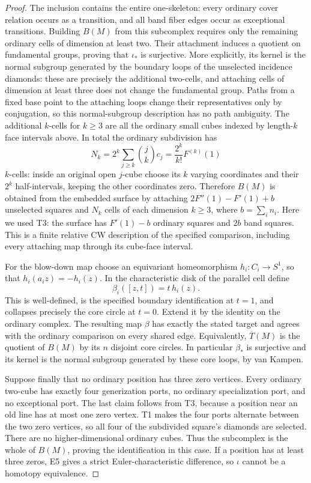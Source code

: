 \begin{proof}
The inclusion contains the entire one-skeleton: every ordinary cover
relation occurs as a transition, and all band fiber edges occur as
exceptional transitions. Building $B(M)$ from this subcomplex requires
only the remaining ordinary cells of dimension at least two. Their
attachment induces a quotient on fundamental groups, proving that
$\iota_*$ is surjective. More explicitly, its kernel is the normal
subgroup generated by the boundary loops of the unselected incidence
diamonds: these are precisely the additional two-cells, and attaching
cells of dimension at least three does not change the fundamental group.
Paths from a fixed base point to the attaching loops change their
representatives only by conjugation, so this normal-subgroup description
has no path ambiguity. The additional $k$-cells for $k\geq3$ are all the
ordinary small cubes indexed by length-$k$ face intervals above. In total
the ordinary subdivision has
\[
 N_k=2^k\sum_{j\geq k}\binom jk c_j
     =\frac{2^k}{k!}F^{(k)}(1)
\]
$k$-cells: inside an original open $j$-cube choose its $k$ varying
coordinates and their $2^k$ half-intervals, keeping the other coordinates
zero. Therefore $B(M)$ is obtained from the embedded surface by attaching
$2F''(1)-F'(1)+b$ unselected squares and $N_k$ cells of each dimension
$k\geq3$, where $b=\sum_i n_i$. Here we used T3: the surface has
$F'(1)-b$ ordinary squares and $2b$ band squares. This is a finite
relative CW description of the specified comparison, including every
attaching map through its cube-face interval.

For the blow-down map choose an equivariant
homeomorphism $h_i:C_i\to S^1$, so that
$h_i(a_i z)=-h_i(z)$. In the characteristic disk of the parallel cell
define
\[
 \beta_i([z,t])=t\,h_i(z).
\]
This is well-defined, is the specified boundary identification at
$t=1$, and collapses precisely the core circle at $t=0$. Extend it by
the identity on the ordinary complex. The resulting map $\beta$ has
exactly the stated target and agrees with the ordinary comparison on
every shared edge. Equivalently, $\overline T(M)$ is the quotient of
$B(M)$ by its $n$ disjoint core circles. In particular $\beta_*$ is
surjective and its kernel is the normal subgroup generated by these
core loops, by van Kampen.

Suppose finally that no ordinary position has three zero vertices.
Every ordinary two-cube has exactly four generization ports, no
ordinary specialization port, and no exceptional port. The last claim
follows from T3, because a position near an old line has at most one
zero vertex. T1 makes the four ports alternate between the two zero
vertices, so all four of the subdivided square's diamonds are selected.
There are no higher-dimensional ordinary cubes. Thus the subcomplex
is the whole of $B(M)$, proving the identification in this case. If a
position has at least three zeros, E5 gives a strict Euler-characteristic
difference, so $\iota$ cannot be a homotopy equivalence.


\end{proof}
